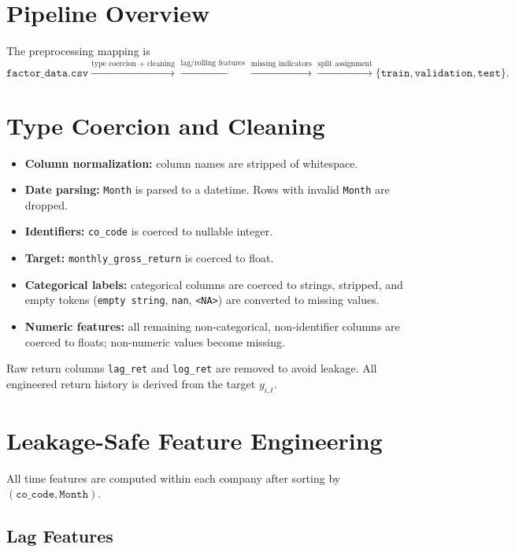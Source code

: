 \documentclass[11pt]{article}
\begin{document}
\section{Pipeline Overview}

The preprocessing mapping is
\[
\texttt{factor\_data.csv}
\xrightarrow{\text{type coercion + cleaning}}
\xrightarrow{\text{lag/rolling features}}
\xrightarrow{\text{missing indicators}}
\xrightarrow{\text{split assignment}}
\{\texttt{train},\texttt{validation},\texttt{test}\}.
\]

\section{Type Coercion and Cleaning}

\begin{itemize}
	\item \textbf{Column normalization:} column names are stripped of whitespace.
	\item \textbf{Date parsing:} \texttt{Month} is parsed to a datetime. Rows with
	invalid \texttt{Month} are dropped.
	\item \textbf{Identifiers:} \texttt{co\_code} is coerced to nullable integer.
	\item \textbf{Target:} \texttt{monthly\_gross\_return} is coerced to float.
	\item \textbf{Categorical labels:} categorical columns are coerced to strings,
	stripped, and empty tokens (\texttt{empty string}, \texttt{nan}, \texttt{<NA>})
	are converted to missing values.
	\item \textbf{Numeric features:} all remaining non-categorical, non-identifier
	columns are coerced to floats; non-numeric values become missing.
\end{itemize}

Raw return columns \texttt{lag\_ret} and \texttt{log\_ret} are removed to avoid
leakage. All engineered return history is derived from the target $y_{i,t}$.

\section{Leakage-Safe Feature Engineering}

All time features are computed within each company after sorting by
$(\texttt{co\_code}, \texttt{Month})$.

\subsection{Lag Features}
\end{document}
